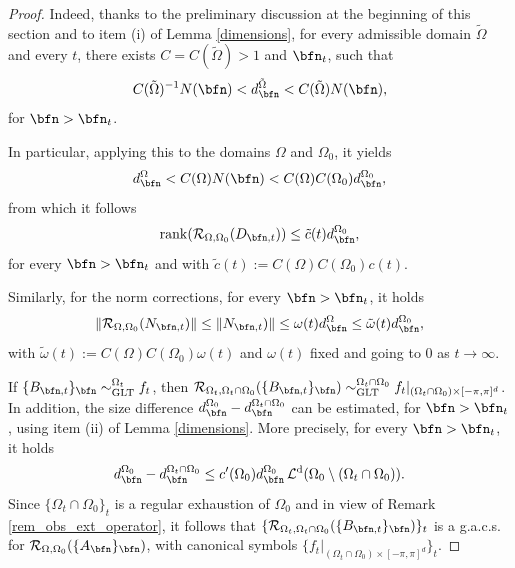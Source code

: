 \documentclass{amsart}
\DeclareMathOperator{\Ld}{\mathcal{L}^d}
\begin{document}
\begin{proof}
    Indeed, thanks to the preliminary discussion at the beginning of this section and to item (i) of Lemma \ref{dimensions}, for every admissible domain $\tilde{\Omega}$ and every $t$, there exists $C=C(\tilde{\Omega})>1$ and $\bfn_t$, such that
    \begin{equation*}
        C(\tilde{\Omega})^{-1}N(\bfn)<d_\bfn^{\tilde{\Omega}}<C(\tilde{\Omega})N(\bfn),
    \end{equation*}
    for $\bfn>\bfn_t$.
    
    In particular, applying this to the domains $\Omega$ and $\Omega_0$, it yields
    \begin{equation*}
        d_\bfn^{\Omega}<C(\Omega)N(\bfn)<C(\Omega)C(\Omega_0)d_\bfn^{\Omega_0},
    \end{equation*}
    from which it follows
    \begin{equation*}
        \mathrm{rank}(\mathcal{R}_{\Omega,\Omega_0}(D_{\bfn,t}))\leq \tilde{c}(t)d_\bfn^{\Omega_0},
    \end{equation*}
    for every $\bfn>\bfn_t$ and with $\tilde{c}(t):=C(\Omega)C(\Omega_0)c(t)$.
    
    Similarly, for the norm corrections, for every $\bfn>\bfn_t$, it holds
    \begin{equation*}
        \|\mathcal{R}_{\Omega,\Omega_0}(N_{\bfn,t})\|\leq \|N_{\bfn,t})\|\leq \omega(t)d_\bfn^{\Omega}\leq\tilde{\omega}(t)d_\bfn^{\Omega_0},
    \end{equation*}
    with $\tilde{\omega}(t):=C(\Omega)C(\Omega_0)\omega(t)$ and $\omega(t)$ fixed and going to $0$ as $t\to\infty$. 
    
    If $\{B_{\bfn,t}\}_\bfn\sim^{\Omega_t}_{\mathrm{GLT}}f_t$, then $\mathcal{R}_{\Omega_t,\Omega_t\cap\Omega_0}(\{B_{\bfn,t}\}_\bfn)\sim^{\Omega_t\cap\Omega_0}_{\mathrm{GLT}}f_t|_{(\Omega_t\cap\Omega_0)\times[-\pi,\pi]^d}$. In addition, the size difference $d_\bfn^{\Omega_0}-d_\bfn^{\Omega_t\cap\Omega_0}$ can be estimated, for $\bfn>\bfn_t$, using item (ii) of Lemma \ref{dimensions}. More precisely, for every $\bfn>\bfn_t$, it holds
    \begin{equation*}
        d_\bfn^{\Omega_0}-d_\bfn^{\Omega_t\cap\Omega_0}\leq c'(\Omega_0)d_\bfn^{\Omega_0}\Ld(\Omega_0\setminus(\Omega_t\cap\Omega_0)).
    \end{equation*}
    Since $\{\Omega_t\cap\Omega_0\}_t$ is a regular exhaustion of $\Omega_0$ and in view of Remark \ref{rem_obs_ext_operator}, it follows that $\{\mathcal{R}_{\Omega_t,\Omega_t\cap\Omega_0}(\{B_{\bfn,t}\}_\bfn)\}_t$ is a g.a.c.s. for $\mathcal{R}_{\Omega,\Omega_0}(\{A_\bfn\}_\bfn)$, with canonical symbols $\{f_t|_{(\Omega_t\cap\Omega_0)\times[-\pi,\pi]^d}\}_t$. 


\end{proof}
\end{document}
